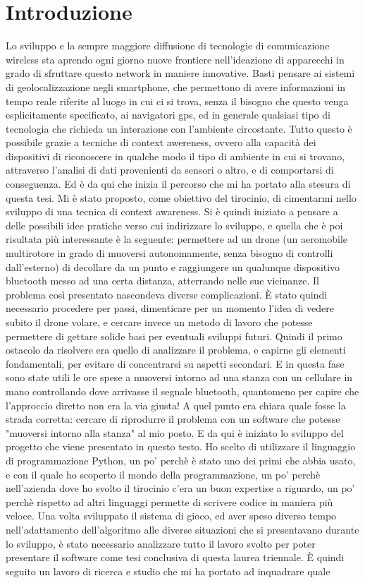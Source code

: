 \chapter*{Introduzione}
Lo sviluppo e la sempre maggiore diffusione di tecnologie di comunicazione wireless sta aprendo ogni giorno nuove frontiere nell'ideazione di apparecchi in grado di sfruttare questo network in maniere innovative. Basti pensare ai sistemi di geolocalizzazione negli smartphone, che permettono di avere informazioni in tempo reale riferite al luogo in cui ci si trova, senza il bisogno che questo venga esplicitamente specificato, ai navigatori gps, ed in generale qualsiasi tipo di tecnologia che richieda un interazione con l'ambiente circostante. Tutto questo è possibile grazie a tecniche di context awereness, ovvero alla capacità dei dispositivi di riconoscere in qualche modo il tipo di ambiente in cui si trovano, attraverso l'analisi di dati provenienti da sensori o altro, e di comportarsi di conseguenza. Ed è da qui che inizia il percorso che mi ha portato alla stesura di questa tesi. Mi è stato proposto, come obiettivo del tirocinio, di cimentarmi nello sviluppo di una tecnica di context awareness. Si è quindi iniziato a pensare a delle possibili idee pratiche verso cui indirizzare lo sviluppo, e quella che è poi risultata più interessante è la seguente: permettere ad un drone (un aeromobile multirotore in grado di muoversi autonomamente, senza bisogno di controlli dall'esterno) di decollare da un punto e raggiungere un qualunque dispositivo bluetooth messo ad una certa distanza, atterrando nelle sue vicinanze. Il problema così presentato nascondeva diverse complicazioni. È stato quindi necessario procedere per passi, dimenticare per un momento l'idea di vedere subito il drone volare, e cercare invece un metodo di lavoro che potesse permettere di gettare solide basi per eventuali sviluppi futuri. Quindi il primo ostacolo da risolvere era quello di analizzare il problema, e capirne gli elementi fondamentali, per evitare di concentrarsi su aspetti secondari. E in questa fase sono state utili le ore spese a muoversi intorno ad una stanza con un cellulare in mano controllando dove arrivasse il segnale bluetooth, quantomeno per capire che l'approccio diretto non era la via giusta! A quel punto era chiara quale fosse la strada corretta: cercare di riprodurre il problema con un software che potesse "muoversi intorno alla stanza" al mio posto. E da qui è iniziato lo sviluppo del progetto che viene presentato in questo testo. Ho scelto di utilizzare il linguaggio di programmazione Python, un po' perchè è stato uno dei primi che abbia usato, e con il quale ho scoperto il mondo della programmazione, un po' perchè nell'azienda dove ho svolto il tirocinio c'era un buon expertise a riguardo, un po' perchè rispetto ad altri linguaggi permette di scrivere codice in maniera più veloce. Una volta sviluppato il sistema di gioco, ed aver speso diverso tempo nell'adattamento dell'algoritmo alle diverse situazioni che si presentavano durante lo sviluppo, è stato necessario analizzare tutto il lavoro svolto per poter presentare il software come tesi conclusiva di questa laurea triennale. È quindi seguito un lavoro di ricerca e studio che mi ha portato ad inquadrare quale 